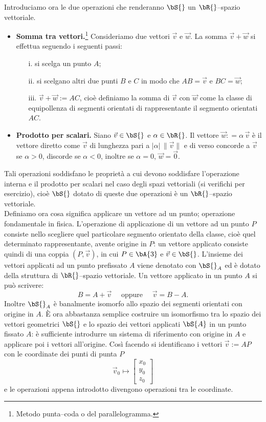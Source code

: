 Introduciamo ora le due operazioni che renderanno $\bS{}$ un $\bR{}$--spazio 
vettoriale. 

\begin{itemize}
  \item {\bf Somma tra vettori.}\footnote{Metodo punta--coda o del 
parallelogramma.} 
  Consideriamo due vettori $\vec v$ e $\vec w$. La somma
  $\vec v+\vec w$ si effettua seguendo i seguenti passi:
  \begin{itemize}
    \item[i.] si scelga un punto $A$;
    \item[ii.] si scelgano altri due punti $B$ e $C$ in modo che $AB = \vec v$ e 
$BC = \vec w$;
    \item[iii.] $\vec v+\vec w := AC$, cio\`e definiamo la somma di $\vec v$ con 
$\vec w$ come
    la classe di equipollenza di segmenti orientati di rappresentante il 
segmento orientati
    $AC$. 
  \end{itemize}
  \item {\bf Prodotto per scalari.} Siano $\vec v\in\bS{}$ e $\alpha\in\bR{}$. 
Il vettore 
  $\vec w: = \alpha \,\vec v$ \`e il vettore diretto come $\vec v$ di lunghezza 
pari a 
  $|\alpha|\, \|\vec v\|$ e di verso concorde a $\vec v$ se $\alpha>0$, discorde 
se $\alpha<0$, 
  inoltre se $\alpha = 0$, $\vec w = \vec 0$. 
\end{itemize}
Tali operazioni soddisfano le propriet\`a a cui devono soddisfare l'operazione 
interna 
e il prodotto per scalari nel caso degli spazi vettoriali (si verifichi per 
esercizio), 
cio\`e $\bS{}$ dotato di queste due operazioni \`e un $\bR{}$--spazio 
vettoriale.\\

Definiamo ora cosa significa applicare un vettore ad un punto; operazione 
fondamentale 
in fisica. L'operazione di applicazione di un vettore ad un punto $P$ consiste 
nello scegliere
quel particolare segmento orientato della classe, cio\`e quel determinato 
rappresentante,
avente origine in $P$: un vettore applicato consiste quindi di una coppia 
$(P,\vec v)$, 
in cui $P\in\bA{3}$ e $\vec v\in \bS{}$. L'insieme dei vettori applicati ad un 
punto prefissato $A$
viene denotato con $\bS{}_A$ ed \`e dotato della struttura di $\bR{}$--spazio 
vettoriale. 
Un vettore applicato in un punto $A$ si pu\`o scrivere:
\[
  B = A+\vec v \quad \textrm{ oppure }\quad  \vec v= B-A.
\]
Inoltre $\bS{}_A$ \`e banalmente isomorfo allo spazio dei segmenti orientati con 
origine in $A$.
\`E ora abbastanza semplice costruire un isomorfismo tra lo spazio dei vettori 
geometrici
$\bS{}$ e lo spazio dei vettori applicati $\bS{A}$ in un punto fissato $A$: \`e 
sufficiente
introdurre un sistema di riferimento con origine in $A$ e applicare poi i 
vettori all'origine.
Cos\`{i} facendo si identificano i vettori $\vec v:= AP$ con le coordinate dei 
punti di punta $P$
\[
  \vec v_0 \longmapsto \begin{bmatrix} x_0\\y_0\\z_0 \end{bmatrix}
\]
e le operazioni appena introdotto divengono operazioni tra le coordinate.

